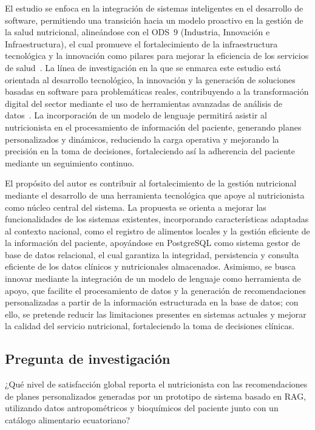 \documentclass[12pt,a4paper]{article}
\begin{document}
El estudio se enfoca en la integración de sistemas inteligentes en el
desarrollo de software, permitiendo una transición hacia un modelo proactivo
en la gestión de la salud nutricional, alineándose con el ODS~9 (Industria,
Innovación e Infraestructura), el cual promueve el fortalecimiento de la
infraestructura tecnológica y la innovación como pilares para mejorar la
eficiencia de los servicios de salud~\cite{un2024}. La línea de investigación
en la que se enmarca este estudio está orientada al desarrollo tecnológico, la
innovación y la generación de soluciones basadas en software para problemáticas
reales, contribuyendo a la transformación digital del sector mediante el uso de
herramientas avanzadas de análisis de datos~\cite{unl2021}. La incorporación de
un modelo de lenguaje permitirá asistir al nutricionista en el procesamiento de
información del paciente, generando planes personalizados y dinámicos,
reduciendo la carga operativa y mejorando la precisión en la toma de
decisiones, fortaleciendo así la adherencia del paciente mediante un
seguimiento continuo.

El propósito del autor es contribuir al fortalecimiento de la gestión
nutricional mediante el desarrollo de una herramienta tecnológica que apoye al
nutricionista como núcleo central del sistema. La propuesta se orienta a
mejorar las funcionalidades de los sistemas existentes, incorporando
características adaptadas al contexto nacional, como el registro de alimentos
locales y la gestión eficiente de la información del paciente, apoyándose en
PostgreSQL como sistema gestor de base de datos relacional, el cual garantiza
la integridad, persistencia y consulta eficiente de los datos clínicos y
nutricionales almacenados. Asimismo, se busca innovar mediante la integración
de un modelo de lenguaje como herramienta de apoyo, que facilite el
procesamiento de datos y la generación de recomendaciones personalizadas a
partir de la información estructurada en la base de datos; con ello, se
pretende reducir las limitaciones presentes en sistemas actuales y mejorar la
calidad del servicio nutricional, fortaleciendo la toma de decisiones clínicas.

\subsection{Pregunta de investigación}

¿Qué nivel de satisfacción global reporta el nutricionista con las
recomendaciones de planes personalizados generadas por un prototipo de sistema
basado en RAG, utilizando datos antropométricos y bioquímicos del paciente
junto con un catálogo alimentario ecuatoriano?
\end{document}
